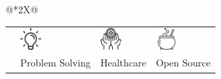 \documentclass{resume}
\begin{document}
\begin{center}
\begin{tabularx}{\linewidth}{@{}*{2}{X}@{}}
{{\begin{tabularx}{\linewidth}{@{}*{4}{>{\centering\arraybackslash}X}@{}}
{            } &
            {\centering
            \includegraphics[width=0.8cm]{images/lamp.png}
            } & 
            {\centering
            \includegraphics[width=0.8cm]{images/healthcare.png}
            } &
            {\centering
            \includegraphics[width=0.8cm]{images/cauldron.png}
            } \\
            {\footnotesize UI/UX} & {\footnotesize Problem Solving} & {\footnotesize Healthcare} & {\footnotesize Open Source}
        \end{tabularx}
    }
}
\end{tabularx}
\end{center}
\end{document}
